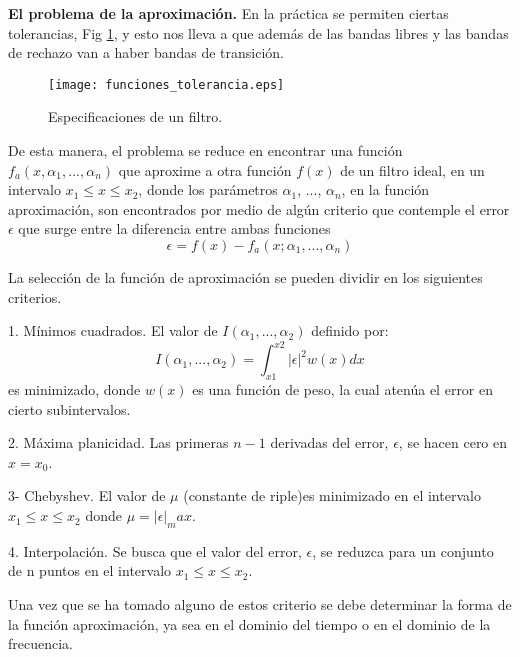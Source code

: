 \documentclass[informe.tex]{subfiles}
\begin{document}
\textbf{ El problema de la aproximación.}\newline\newline
En la práctica se permiten ciertas tolerancias, Fig \ref{fig:filtros:funciones:tolerancia}, y esto nos lleva a que además de las bandas libres y las bandas de rechazo van a haber bandas de transición.
 
	\begin{figure}[h!]
	\centering
	\texttt{[image: funciones\_tolerancia.eps]}	
	\caption{Especificaciones de un filtro.}
	\label{fig:filtros:funciones:tolerancia}
	\end{figure}	 
	
De esta manera, el problema se reduce en encontrar una función $f_a(x, \alpha_1,...,\alpha_n)$ que aproxime a otra función  $f(x)$ de un filtro ideal, en un intervalo $x_1 \leq x \leq x_2$, donde los parámetros $\alpha_1$, $...$, $\alpha_n$, en la función aproximación, son encontrados por medio de algún criterio que contemple el error $\epsilon$ que surge entre la diferencia entre ambas funciones 
	$$
		\epsilon=f(x)-f_a(x; \alpha_1, ..., \alpha_n) 
	$$	

La selección de la función de aproximación se pueden dividir en los siguientes criterios.\newline

1. Mínimos cuadrados. El valor de $I(\alpha_1, ..., \alpha_2)$ definido por:
	$$
		I(\alpha_1, ..., \alpha_2) = \int_{x1}^{x2} |\epsilon|^2 w(x) dx
	$$
es minimizado, donde $w(x)$ es una función de peso, la cual atenúa el error en cierto subintervalos.\newline

2. Máxima planicidad. Las primeras $n-1$ derivadas del error, $\epsilon$, se hacen cero en $x=x_0$.\newline

3- Chebyshev. El valor de $\mu$ (constante de riple)es minimizado en el intervalo $x_1 \leq x \leq x_2$ donde $\mu=|\epsilon|_max$.\newline

4. Interpolación. Se busca que el valor del error, $\epsilon$, se reduzca para un conjunto de n puntos en el intervalo  $x_1 \leq x \leq x_2$.\newline
	
Una vez que se ha tomado alguno de estos criterio se debe determinar la forma de la función aproximación, ya sea en el dominio del tiempo o en el dominio de la frecuencia.\newline\newline
\end{document}
